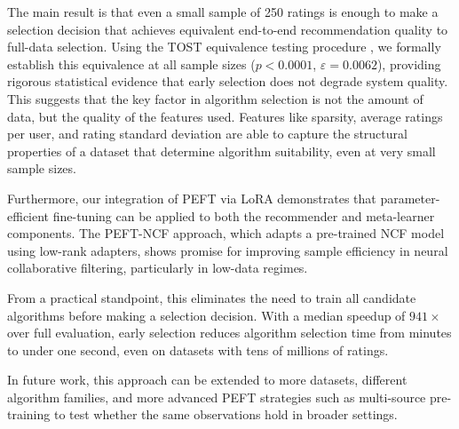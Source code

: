\documentclass[conference]{IEEEtran}
\begin{document}
The main result is that even a small sample of 250 ratings is enough to make a selection decision that achieves equivalent end-to-end recommendation quality to full-data selection. Using the TOST equivalence testing procedure \cite{schuirmann1987tost}, we formally establish this equivalence at all sample sizes ($p < 0.0001$, $\varepsilon = 0.0062$), providing rigorous statistical evidence that early selection does not degrade system quality. This suggests that the key factor in algorithm selection is not the amount of data, but the quality of the features used. Features like sparsity, average ratings per user, and rating standard deviation \cite{cunha2018metalearning} are able to capture the structural properties of a dataset that determine algorithm suitability, even at very small sample sizes.

Furthermore, our integration of PEFT via LoRA \cite{hu2022lora} demonstrates that parameter-efficient fine-tuning can be applied to both the recommender and meta-learner components. The PEFT-NCF approach, which adapts a pre-trained NCF model using low-rank adapters, shows promise for improving sample efficiency in neural collaborative filtering, particularly in low-data regimes.

From a practical standpoint, this eliminates the need to train all candidate algorithms before making a selection decision. With a median speedup of $941\times$ over full evaluation, early selection reduces algorithm selection time from minutes to under one second, even on datasets with tens of millions of ratings.

In future work, this approach can be extended to more datasets, different algorithm families, and more advanced PEFT strategies such as multi-source pre-training to test whether the same observations hold in broader settings.



\end{document}
